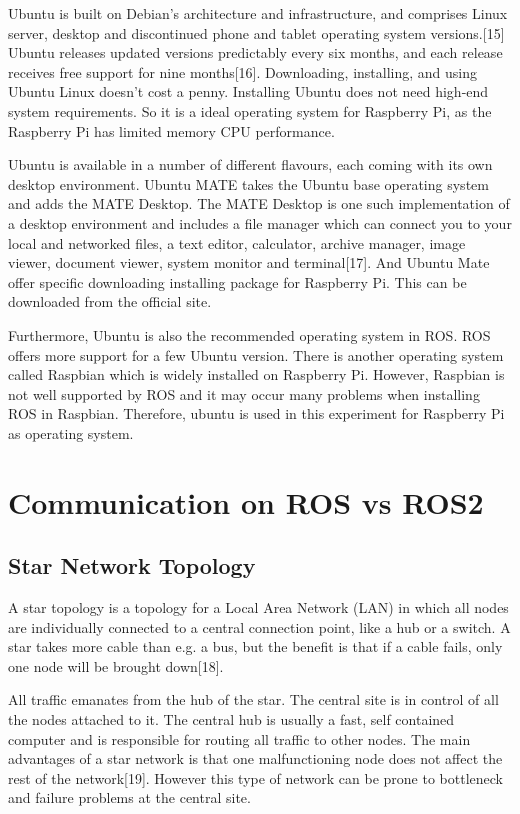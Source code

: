 \documentclass{mproj}
\begin{document}
Ubuntu is built on Debian's architecture and infrastructure, and comprises Linux server, desktop and discontinued phone and tablet operating system versions.[15] Ubuntu releases updated versions predictably every six months, and each release receives free support for nine months[16]. Downloading, installing, and using Ubuntu Linux doesn’t cost a penny. Installing Ubuntu does not need high-end system requirements. So it is a ideal operating system for Raspberry Pi, as the Raspberry Pi has limited memory CPU performance. 

Ubuntu is available in a number of different flavours, each coming with its own desktop environment. Ubuntu MATE takes the Ubuntu base operating system and adds the MATE Desktop. The MATE Desktop is one such implementation of a desktop environment and includes a file manager which can connect you to your local and networked files, a text editor, calculator, archive manager, image viewer, document viewer, system monitor and terminal[17]. And Ubuntu Mate offer specific downloading installing package for Raspberry Pi. This can be downloaded from the official site.

Furthermore, Ubuntu is also the recommended operating system in ROS. ROS offers more support for a few Ubuntu version. There is another operating system called Raspbian which is widely installed on Raspberry Pi. However, Raspbian is not well supported by ROS and it may occur many problems when installing ROS in Raspbian. Therefore, ubuntu is used in this experiment for Raspberry Pi as operating system.

\section{Communication on ROS vs ROS2}

\subsection{Star Network Topology}
A star topology is a topology for a Local Area Network (LAN) in which all nodes are individually connected to a central connection point, like a hub or a switch. A star takes more cable than e.g. a bus, but the benefit is that if a cable fails, only one node will be brought down[18].

All traffic emanates from the hub of the star. The central site is in control of all the nodes attached to it. The central hub is usually a fast, self contained computer and is responsible for routing all traffic to other nodes. The main advantages of a star network is that one malfunctioning node does not affect the rest of the network[19]. However this type of network can be prone to bottleneck and failure problems at the central site.
\end{document}
